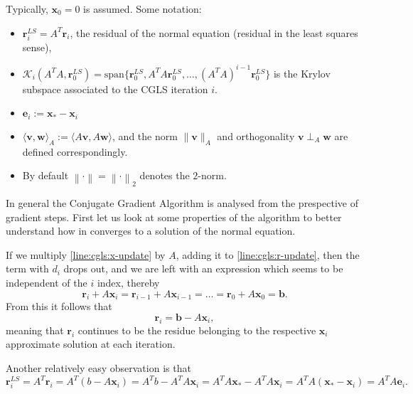 \documentclass{article}
\newcommand{\mbf}[1]{\mathbf{#1}}
\begin{document}
	
	Typically, $\mathbf{x}_{0}=0$ is assumed.  Some notation:
	\begin{itemize}
		\item $\mathbf{r}^{LS}_i=A^T\mathbf{r}_i$, the residual of the normal equation (residual in the least squares sense),
		\item $\mathcal{K}_i(A^TA,\mathbf{r}_0^{LS})=\text{span}\{\mathbf{r}_0^{LS},A^TA\mathbf{r}_0^{LS},\ldots,(A^TA)^{i-1}\mathbf{r}_0^{LS}\}$ is the Krylov subspace associated to the CGLS iteration  $i$.
		\item $\mbf{e}_i:=\mbf{x}_{\ast}-\mathbf{x}_i$
		\item $\langle\mbf{v},\mbf{w}\rangle_{A}:=\langle A\mbf{v},A\mbf{w}\rangle$, and the norm $\|\mbf{v}\|_A$ and orthogonality $ \mbf{v}\perp_{A}\mbf{w}$ are defined correspondingly.
		\item By default $\left\| \cdot \right\| = \left\| \cdot \right\|_2$ denotes the $2$-norm.
	\end{itemize}
	In general the Conjugate Gradient Algorithm is analysed from the prespective of gradient steps. First let us look at some properties of the algorithm to better understand how in converges to a solution of the normal equation. 
	
	If we multiply \autoref{line:cgls:x-update} by $A$, adding it to \autoref{line:cgls:r-update}, then the term with $d_i$ drops out, and we are left with an expression which seems to be independent of the $i$ index, thereby
	\begin{equation}
		\textbf{r}_i+A\textbf{x}_i = \textbf{r}_{i-1}+A\textbf{x}_{i-1} = \dots = \textbf{r}_0 +A\textbf{x}_0 = \textbf{b}. 
	\end{equation}
	From this it follows that 
	\begin{equation}
		\textbf{r}_i = \textbf{b} - A \textbf{x}_i,
	\end{equation}
	meaning that $\textbf{r}_i$ continues to be the residue belonging to the respective $\textbf{x}_i$ approximate solution at each iteration.
	
	Another relatively easy observation is that 
	\begin{equation}\label{eq:riLS-ei}
		\textbf{r}_i^{LS} = A^T \textbf{r}_i = A^T \left(b - A \textbf{x}_i\right) = A^T b - A^T A \textbf{x}_i = A^T A \textbf{x}_\ast - A^T A \textbf{x}_i = A^T A \left(\textbf{x}_\ast - \textbf{x}_i\right) = A^T A \textbf{e}_i .
	\end{equation}
	
\end{document}
